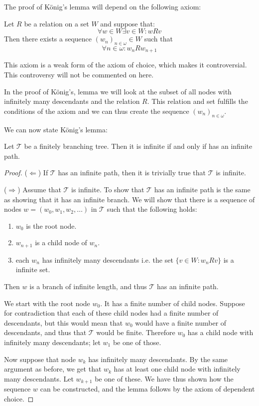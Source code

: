 \documentclass[../main.tex]{subfiles}
\begin{document}
The proof of König's lemma will depend on the following axiom:
\begin{axiom}
	Let $R$ be a relation on a set $W$ and suppose that:
	\[\forall w\in W\exists v\in W: wRv\]
	Then there exists a sequence $(w_n)_{n\in\omega}\in W$ such that
	\[\forall n\in\omega: w_nRw_{n+1}\]
\end{axiom}

This axiom is a weak form of the axiom of choice, which makes it controversial. This controversy will not be commented on here. 


In the proof of König's,
lemma we will look at the subset of all nodes with infinitely many descendants
and the relation $R$. This relation and
set
fulfills the conditions of the axiom and we can thus create the sequence
$(w_n)_{n\in\omega}$.

We can now state König's lemma:
\begin{lemma}
	\label{lem:kong}
	Let $\mathcal{T}$ be a finitely branching tree. Then it is infinite if
	and only if has an infinite path.
\end{lemma}
\begin{proof}
	($\Leftarrow$)
	If $\mathcal{T}$ has an infinite path, then it is trivially true that
	$\mathcal{T}$ is infinite. 

	($\Rightarrow$) Assume that $\mathcal{T}$ is infinite. To show that
	$\mathcal{T}$ has an infinite path is the same as showing that it has
	an infinite branch. We will show that there is a sequence of nodes
	$w=(w_0,w_1,w_2,\ldots)$ in $\mathcal{T}$ such that the following holds:
	\begin{enumerate}
		\item $w_0$ is the root node.
		\item $w_{n+1}$ is a child node of $w_n$.
		\item each $w_n$ has infinitely many descendants i.e. the
			set $\{v\in W:w_nRv\}$ is a infinite set.
	\end{enumerate}
	Then $w$ is a branch of infinite length, and thus $\mathcal{T}$ has an
	infinite path.

	We start with the root node $w_0$. It has a finite number of child
	nodes. Suppose for contradiction that each of these child nodes had a
	finite number of descendants, but this would mean that $w_0$ would have
	a finite number of descendants, and thus that $\mathcal{T}$ would be
	finite. Therefore $w_0$ has a child node with infinitely many
	descendants; let $w_1$ be one of those.

	Now suppose that node $w_k$ has infinitely many descendants. By the
	same argument as before, we get that $w_k$ has at least one child node
	with infinitely many descendants. Let $w_{k+1}$ be one of these. We have
	thus shown how the sequence $w$ can be constructed, and the lemma
	follows by the axiom of dependent choice.
\end{proof}
\end{document}
